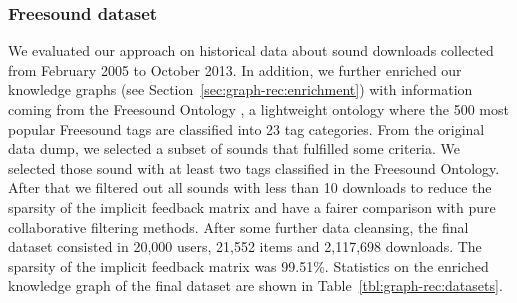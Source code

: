 \subsubsection{Freesound dataset}\label{fs_dataset}
We evaluated our approach on historical data about sound downloads collected from February 2005 to October 2013. In addition, we further enriched our knowledge graphs (see Section~\ref{sec:graph-rec:enrichment}) with information coming from the Freesound Ontology \citep[chapter 6]{font2015tag}, a lightweight ontology where the 500 most popular Freesound tags are classified into 23 tag categories. From the original data dump, we selected a subset of sounds that fulfilled some criteria. We selected those sound with at least two tags classified in the Freesound Ontology. After that we filtered out all sounds with less than 10 downloads to reduce the sparsity of the implicit feedback matrix and have a fairer comparison with pure collaborative filtering methods. 
After some further data cleansing, the final dataset consisted in 20,000 users, 21,552 items and 2,117,698 downloads.%
The sparsity of the implicit feedback matrix was 99.51\%. Statistics on the enriched knowledge graph of the final dataset are shown in Table~\ref{tbl:graph-rec:datasets}.


